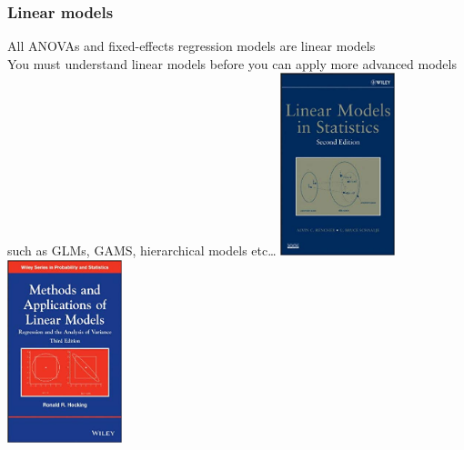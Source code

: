 \documentclass[color=usenames,dvipsnames]{beamer}\usepackage[]{graphicx}\usepackage[]{color}
\begin{document}
\begin{frame}
  \frametitle{Linear models}
  All ANOVAs and fixed-effects regression models are linear models \\
  \vspace{12pt}
  You must understand linear models before you can apply more advanced
  models such as GLMs, GAMS, hierarchical models etc\dots  
  \vfill
  \centering
  \includegraphics[width=0.25\textwidth]{figure/Rencher_Schaal_book} \hspace{1cm}
  \includegraphics[width=0.25\textwidth]{figure/Hocking_book} \\
\end{frame}
\end{document}
